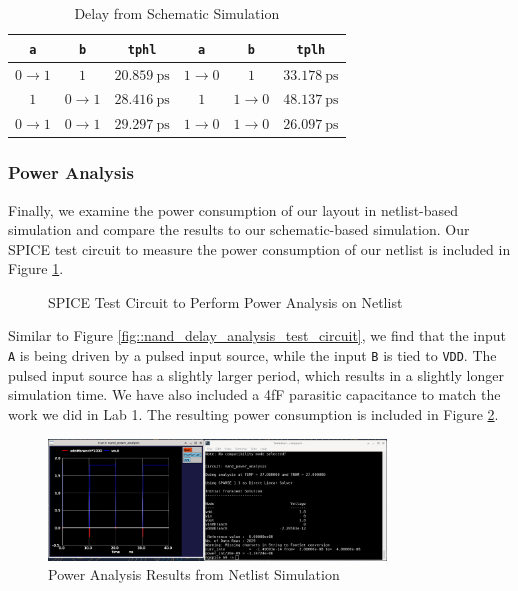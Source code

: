 \documentclass{article}
\begin{document}
	\begin{table}[H]
	\begin{center}
	\caption{Delay from Schematic Simulation}
	\label{table::nand_gate_delay_analysis_schem}
	\begin{tabular}{| c | c | c || c | c | c |}
		\hline
		\texttt{a} & \texttt{b} & \texttt{tphl} & \texttt{a} & \texttt{b} & \texttt{tplh} \\
		\hline	
		$0 \rightarrow 1$ & $1$ & $20.859\ \text{ps}$ & $1 \rightarrow 0$ & $1$ & $33.178\ \text{ps}$\\
		\hline	
		$1$ & $0 \rightarrow 1$ & $28.416\ \text{ps}$ & $1$ & $1 \rightarrow 0$ & $48.137\ \text{ps}$\\
		\hline	
		$0 \rightarrow 1$ & $0 \rightarrow 1$ & $29.297\ \text{ps}$ & $1 \rightarrow 0$ & $1 \rightarrow 0$ & $26.097\ \text{ps}$\\
		\hline
	\end{tabular}
	\end{center}
	\end{table}
	
	\subsubsection{Power Analysis}
	
	Finally, we examine the power consumption of our layout in netlist-based simulation and compare the results to our schematic-based simulation. Our SPICE test circuit to measure the power consumption of our netlist is included in Figure \ref{fig::nand_power_analysis_test_circuit}.
	
	\begin{figure}[H]
		
		\caption{SPICE Test Circuit to Perform Power Analysis on Netlist}
		\label{fig::nand_power_analysis_test_circuit}
	\end{figure}
	
	\noindent Similar to Figure \ref{fig::nand_delay_analysis_test_circuit}, we find that the input \texttt{A} is being driven by a pulsed input source, while the input \texttt{B} is tied to \texttt{VDD}. The pulsed input source has a slightly larger period, which results in a slightly longer simulation time. We have also included a 4fF parasitic capacitance to match the work we did in Lab 1. The resulting power consumption is included in Figure \ref{fig::nand_power_analysis}.
	
	\begin{figure}[H]
		\centerline{\includegraphics[width=0.8\textwidth]{nand_power_analysis.png}}
		\caption{Power Analysis Results from Netlist Simulation}
		\label{fig::nand_power_analysis}
	\end{figure}
	
\end{document}
